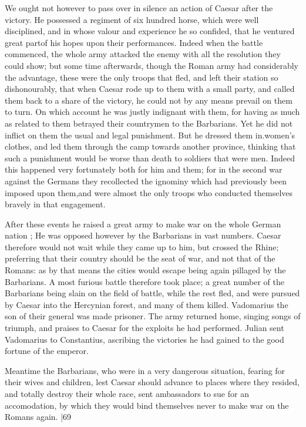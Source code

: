 We ought not however to pass over in silence an action of Caesar after the victory. He possessed a regiment of six hundred horse, which were well disciplined, and in whose valour and experience he so confided, that he ventured great partof his hopes upon their performances. Indeed when the battle commenced, the whole army attacked the enemy with all the resolution they could show; but some time afterwards, though the Roman army had considerably the advantage, these were the only troops that fled, and left their station so dishonourably, that when Caesar rode up to them with a small party, and called them back to a share of the victory, he could not by any means prevail on them to turn. On which account he was justly indignant with them, for having as much as related to them betrayed their countrymen to the Barbarians. Yet he did not inflict on them the usual and legal punishment. But he dressed them in.women's clothes, and led them through the camp towards another province, thinking that such a punishment would be worse than death to soldiers that were men. Indeed this happened very fortunately both for him and them; for in the second war against the Germans they recollected the ignominy which had previously been imposed upon them,and were almost the only troops who conducted themselves bravely in that engagement.

After these events he raised a great army to make war on the whole German nation ; He was opposed however by the Barbarians in vast numbers. Caesar therefore would not wait while they came up to him, but crossed the Rhine; preferring that their country should be the seat of war, and not that of the Romans: as by that means the cities would escape being again pillaged by the Barbarians. A most furious battle therefore took place; a great number of the Barbarians being slain on the field of battle, while the rest fled, and were pursued by Caesar into the Hercynian forest, and many of them killed. Vadomarius the son of their general was made prisoner. The army returned home, singing songs of triumph, and praises to Caesar for the exploits he had performed. Julian sent Vadomarius to Constantius, ascribing the victories he had gained to the good fortune of the emperor.

Meantime the Barbarians, who were in a very dangerous situation, fearing for their wives and children, lest Caesar should advance to places where they resided, and totally destroy their whole race, sent ambassadors to sue for an accomodation, by which they would bind themselves never to make war on the Romans again.
|69

